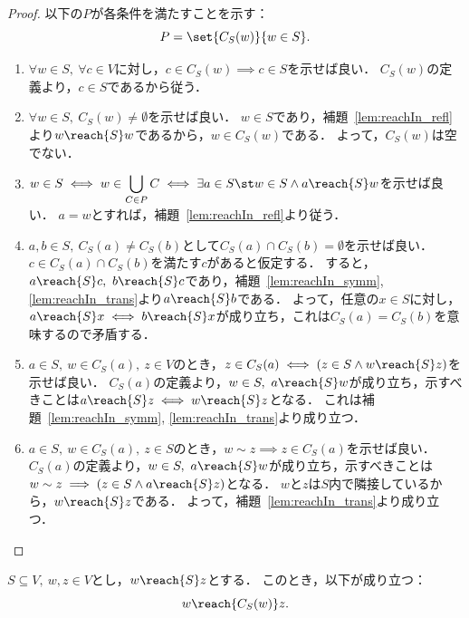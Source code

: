 \begin{proof}
  以下の$P$が各条件を満たすことを示す：
  \begin{equation}
    P = \set{C_S(w)}{w \in S}.
  \end{equation}
  \begin{enumerate}[label = (\arabic*)]
    \item $\forall w \in S,\ \forall c \in V$に対し，$c \in C_S(w) \implies c \in S$を示せば良い．
    $C_S(w)$の定義より，$c \in S$であるから従う．
    
    \item $\forall w \in S,\ C_S(w) \ne \emptyset$を示せば良い．
    $w \in S$であり，補題~\ref{lem:reachIn_refl}より$w \reach{S} w$であるから，$w \in C_S(w)$である．
    よって，$C_S(w)$は空でない．

    \item $w \in S \iff w \in \displaystyle \bigcup_{C \in P} C \iff \exists a \in S \st w \in S \land a \reach{S} w$を示せば良い．
    $a = w$とすれば，補題~\ref{lem:reachIn_refl}より従う．

    \item $a, b \in S,\ C_S(a) \ne C_S(b)$として$C_S(a) \cap C_S(b) = \emptyset$を示せば良い．
    $c \in C_S(a) \cap C_S(b)$を満たす$c$があると仮定する．
    すると，$a \reach{S} c,\ b \reach{S} c$であり，補題~\ref{lem:reachIn_symm}, \ref{lem:reachIn_trans}より$a \reach{S} b$である．
    よって，任意の$x \in S$に対し，$a \reach{S} x \iff b \reach{S} x$が成り立ち，これは$C_S(a) = C_S(b)$を意味するので矛盾する．

    \item $a \in S,\ w \in C_S(a),\ z \in V$のとき，$z \in C_S(a) \iff (z \in S \land w \reach{S} z)$を示せば良い．
    $C_S(a)$の定義より，$w \in S,\ a \reach{S} w$が成り立ち，示すべきことは$a \reach{S} z \iff w \reach{S} z$となる．
    これは補題~\ref{lem:reachIn_symm}, \ref{lem:reachIn_trans}より成り立つ．

    \item $a \in S,\ w \in C_S(a),\ z \in S$のとき，$w \sim z \implies z \in C_S(a)$を示せば良い．
    $C_S(a)$の定義より，$w \in S,\ a \reach{S} w$が成り立ち，示すべきことは$w \sim z \implies (z \in S \land a \reach{S} z)$となる．
    $w$と$z$は$S$内で隣接しているから，$w \reach{S} z$である．
    よって，補題~\ref{lem:reachIn_trans}より成り立つ．
  \end{enumerate}
\end{proof}

\begin{lemma}
  \label{lem:reachIn_confine}
  \leanok
  \uses{}
  $S \subseteq V,\ w, z \in V$とし，$w \reach{S} z$とする．
  このとき，以下が成り立つ：
  \begin{equation}
    w \reach{C_S(w)} z.
  \end{equation}
\end{lemma}

